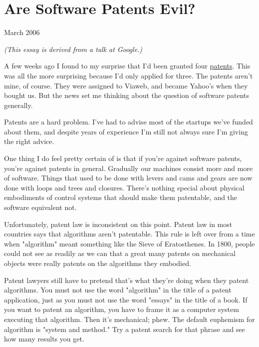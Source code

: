 \chapter{Are Software Patents Evil?}


            
              
                


                  March 2006

\emph{(This essay is derived from a talk at Google.)}

A few weeks ago I found to my surprise that I'd
                  been granted four
                  \href{http://paulgraham.infogami.com/blog/morepatents}{patents}. This was all the more surprising because I'd only applied
                  for three. The patents aren't mine, of course. They were
                  assigned to Viaweb, and became Yahoo's when they bought us.
                  But the news set me thinking about the question of software
                  patents generally.

Patents are a hard problem. I've
                  had to advise most of the startups we've funded about them,
                  and despite years of experience I'm still not always sure I'm
                  giving the right advice.

One thing I do feel pretty
                  certain of is that if you're against software patents, you're
                  against patents in general. Gradually our machines consist
                  more and more of software. Things that used to be done with
                  levers and cams and gears are now done with loops and trees
                  and closures. There's nothing special about physical
                  embodiments of control systems that should make them
                  patentable, and the software equivalent not.

Unfortunately,
                  patent law is inconsistent on this point. Patent law in most
                  countries says that algorithms aren't patentable. This rule is
                  left over from a time when "algorithm" meant something like
                  the Sieve of Eratosthenes. In 1800, people could not see as
                  readily as we can that a great many patents on mechanical
                  objects were really patents on the algorithms they
                  embodied.

Patent lawyers still have to pretend
                  that's what they're doing when they patent algorithms. You
                  must not use the word "algorithm" in the title of a patent
                  application, just as you must not use the word "essays" in the
                  title of a book. If you want to patent an algorithm, you have
                  to frame it as a computer system executing that algorithm.
                  Then it's mechanical; phew. The default euphemism for
                  algorithm is "system and method." Try a patent search for that
                  phrase and see how many results you get.

